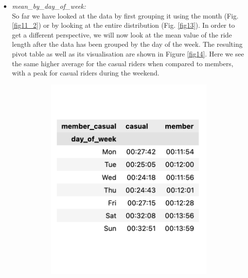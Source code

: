\documentclass[12pt]{article}
\begin{document}
\begin{itemize}
	\item \textit{mean\_by\_day\_of\_week:}\\
	So far we have looked at the data by first grouping it using the month (Fig. \ref{fig11_2}) or by looking at the entire distribution (Fig. \ref{fig13}). In order to get a different perspective, we will now look at the mean value of the ride length after the data has been grouped by the day of the week. The resulting pivot table as well as its visualisation are shown in Figure \ref{fig14}. Here we see the same higher average for the casual riders when compared to members, with a peak for casual riders during the weekend.  
	
	\begin{figure}[h]
	\hspace{0.8in}
	\begin{subfigure}{.2\textwidth}
		\includegraphics[scale=0.6]{dayofweek_t.png} 
		\caption{}
		\label{fig14_1}
	\end{subfigure}
	\begin{subfigure}{.55\textwidth}
	\hspace{1.2in}

\end{subfigure}
\end{figure}
\end{itemize}
\end{document}
